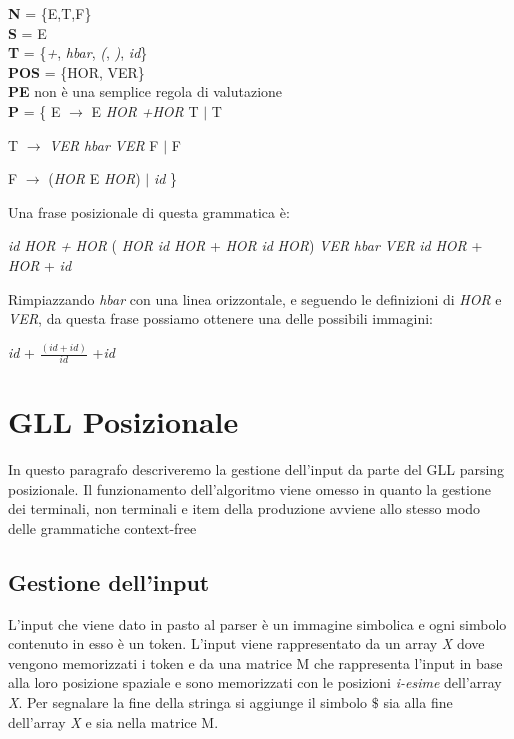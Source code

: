 \begin{center}
	\textbf{N} = \{E,T,F\} \\
	\textbf{S} = E  \\
	\textbf{T} =  \{\textit{+}, \textit{hbar}, \textit{(}, \textit{)}, \textit{id}\} \\
	\textbf{POS}  = \{HOR, VER\}\\
	\textbf{PE} non è una semplice regola di valutazione\\
	\textbf{P}   = \{ E $\to$ E \textit{HOR} \textit{+}\textit{HOR} T $\mid$ T \par 
	         \hspace{1.1cm}T $\to$ \textit{VER} \textit{hbar} \textit{VER} F $\mid$ F \par 
	         \hspace{1.1cm} F $\to$ (\textit{HOR} E \textit{HOR}) $\mid$ \textit{id}  \}   
\end{center}
Una frase posizionale di questa grammatica è:
\begin{center}
	\textit{id} \textit{HOR} \textit{+} \textit{HOR} ( \textit{HOR} \textit{id} \textit{HOR} + \textit{HOR} \textit{id} \textit{HOR}) \textit{VER} \textit{hbar} \textit{VER} \textit{id} \textit{HOR} + \textit{HOR} + \textit{id}
\end{center}
Rimpiazzando \textit{hbar} con una linea orizzontale, e seguendo le definizioni di \textit{HOR} e \textit{VER}, da questa frase possiamo ottenere una delle possibili immagini:
\begin{center}
	 \textit{id} + $\frac{(\textit{id} + \textit{id})}{\textit{id}}$ +\textit{id}
\end{center}
\section{GLL Posizionale}
In questo paragrafo descriveremo la gestione dell'input da parte del GLL parsing posizionale. Il funzionamento dell'algoritmo viene omesso in quanto la gestione dei terminali, non terminali e item della produzione avviene allo stesso modo delle grammatiche context-free
\subsection{Gestione dell'input}
L'input che viene dato in pasto al parser è un immagine simbolica e ogni simbolo contenuto in esso è un token. L'input viene rappresentato da un array \textit{X} dove vengono memorizzati i token e da una matrice M che rappresenta l'input in base alla loro posizione spaziale e sono memorizzati con le posizioni \textit{i-esime} dell'array \textit{X}. Per segnalare la fine della stringa si aggiunge il simbolo $\$$ sia alla fine dell'array \textit{X} e sia nella matrice M.
